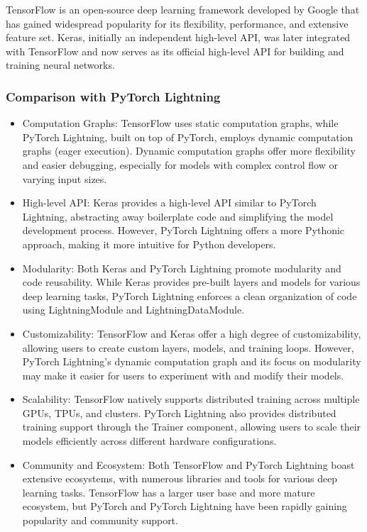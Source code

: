 \documentclass[12pt]{article}
\begin{document}
TensorFlow is an open-source deep learning framework developed by Google that has gained widespread popularity for its flexibility, performance, and extensive feature set. Keras, initially an independent high-level API, was later integrated with TensorFlow and now serves as its official high-level API for building and training neural networks.

\subsubsection{Comparison with PyTorch Lightning}

\begin{itemize}
    \item Computation Graphs: TensorFlow uses static computation graphs, while PyTorch Lightning, built on top of PyTorch, employs dynamic computation graphs (eager execution). Dynamic computation graphs offer more flexibility and easier debugging, especially for models with complex control flow or varying input sizes.
    \item High-level API: Keras provides a high-level API similar to PyTorch Lightning, abstracting away boilerplate code and simplifying the model development process. However, PyTorch Lightning offers a more Pythonic approach, making it more intuitive for Python developers.
    \item Modularity: Both Keras and PyTorch Lightning promote modularity and code reusability. While Keras provides pre-built layers and models for various deep learning tasks, PyTorch Lightning enforces a clean organization of code using LightningModule and LightningDataModule.
    \item Customizability: TensorFlow and Keras offer a high degree of customizability, allowing users to create custom layers, models, and training loops. However, PyTorch Lightning's dynamic computation graph and its focus on modularity may make it easier for users to experiment with and modify their models.
    \item Scalability: TensorFlow natively supports distributed training across multiple GPUs, TPUs, and clusters. PyTorch Lightning also provides distributed training support through the Trainer component, allowing users to scale their models efficiently across different hardware configurations.
    \item Community and Ecosystem: Both TensorFlow and PyTorch Lightning boast extensive ecosystems, with numerous libraries and tools for various deep learning tasks. TensorFlow has a larger user base and more mature ecosystem, but PyTorch and PyTorch Lightning have been rapidly gaining popularity and community support.
\end{itemize}
\end{document}
